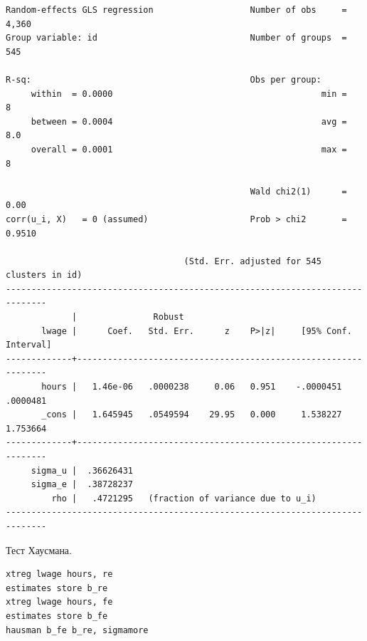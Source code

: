 \documentclass[]{book}
\begin{document}
\begin{verbatim}
Random-effects GLS regression                   Number of obs     =      4,360
Group variable: id                              Number of groups  =        545

R-sq:                                           Obs per group:
     within  = 0.0000                                         min =          8
     between = 0.0004                                         avg =        8.0
     overall = 0.0001                                         max =          8

                                                Wald chi2(1)      =       0.00
corr(u_i, X)   = 0 (assumed)                    Prob > chi2       =     0.9510

                                   (Std. Err. adjusted for 545 clusters in id)
------------------------------------------------------------------------------
             |               Robust
       lwage |      Coef.   Std. Err.      z    P>|z|     [95% Conf. Interval]
-------------+----------------------------------------------------------------
       hours |   1.46e-06   .0000238     0.06   0.951    -.0000451    .0000481
       _cons |   1.645945   .0549594    29.95   0.000     1.538227    1.753664
-------------+----------------------------------------------------------------
     sigma_u |  .36626431
     sigma_e |  .38728237
         rho |   .4721295   (fraction of variance due to u_i)
------------------------------------------------------------------------------
\end{verbatim}

Тест Хаусмана.

\begin{verbatim}
xtreg lwage hours, re
estimates store b_re
xtreg lwage hours, fe
estimates store b_fe
hausman b_fe b_re, sigmamore
\end{verbatim}
\end{document}
